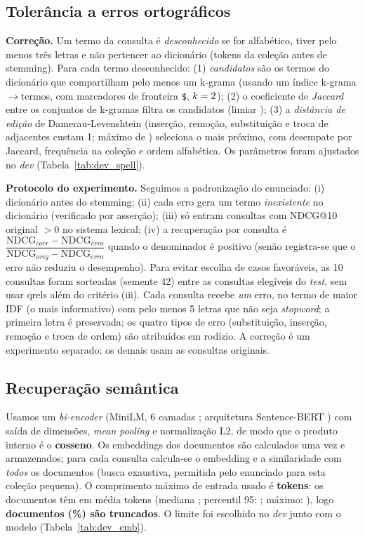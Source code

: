 \subsection{Tolerância a erros ortográficos}
\textbf{Correção.} Um termo da consulta é \emph{desconhecido} se for alfabético, tiver pelo menos três letras e não pertencer ao dicionário (tokens da coleção antes de stemming). Para cada termo desconhecido: (1) \emph{candidatos} são os termos do dicionário que compartilham pelo menos um k-grama (usando um índice k-grama$\rightarrow$termos, com marcadores de fronteira \texttt{\$}, $k=2$); (2) o coeficiente de \emph{Jaccard} entre os conjuntos de k-gramas filtra os candidatos (limiar \SpJ); (3) a \emph{distância de edição} de Damerau-Levenshtein \cite{damerau1964,levenshtein1966} (inserção, remoção, substituição e troca de adjacentes custam 1; máximo de \SpEdit) seleciona o mais próximo, com desempate por Jaccard, frequência na coleção e ordem alfabética. Os parâmetros foram ajustados no \emph{dev} (Tabela~\ref{tab:dev_spell}).

\textbf{Protocolo do experimento.} Seguimos a padronização do enunciado: (i) dicionário antes do stemming; (ii) cada erro gera um termo \emph{inexistente} no dicionário (verificado por asserção); (iii) só entram consultas com NDCG@10 original $>0$ no sistema lexical; (iv) a recuperação por consulta é $\dfrac{\mathrm{NDCG}_{corr}-\mathrm{NDCG}_{erro}}{\mathrm{NDCG}_{orig}-\mathrm{NDCG}_{erro}}$ quando o denominador é positivo (senão registra-se que o erro não reduziu o desempenho). Para evitar escolha de casos favoráveis, as 10 consultas foram sorteadas (semente 42) entre as \TypoEligible{} consultas elegíveis do \emph{test}, sem usar qrels além do critério (iii). Cada consulta recebe \emph{um} erro, no termo de maior IDF (o mais informativo) com pelo menos 5 letras que não seja \emph{stopword}; a primeira letra é preservada; os quatro tipos de erro (substituição, inserção, remoção e troca de ordem) são atribuídos em rodízio. A correção é um experimento separado: os demais usam as consultas originais.

\subsection{Recuperação semântica}
Usamos um \emph{bi-encoder} \texttt{\EncName} (MiniLM, 6 camadas \cite{wang2020minilm}; arquitetura Sentence-BERT \cite{reimers2019sbert}) com saída de \EncDim{} dimensões, \emph{mean pooling} e normalização L2, de modo que o produto interno é o \textbf{cosseno}. Os embeddings dos documentos são calculados uma vez e armazenados; para cada consulta calcula-se o embedding e a similaridade com \emph{todos} os documentos (busca exaustiva, permitida pelo enunciado para esta coleção pequena). O comprimento máximo de entrada usado é \textbf{\EncMaxLen{} tokens}: os documentos têm em média \TokMean{} tokens (mediana \TokMedian{}; percentil 95: \TokPNinetyFive{}; máximo: \TokMax{}), logo \textbf{\EncTrunc{} documentos (\EncTruncPct\%) são truncados}. O limite foi escolhido no \emph{dev} junto com o modelo (Tabela~\ref{tab:dev_emb}).

